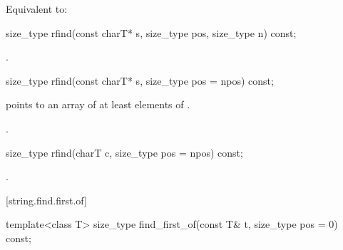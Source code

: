 \begin{itemdescr}
\pnum
\effects
Equivalent to: 
\end{itemdescr}

%
\begin{itemdecl}
size_type rfind(const charT* s, size_type pos, size_type n) const;
\end{itemdecl}

\begin{itemdescr}
\pnum
\returns
{}.
\end{itemdescr}

%
\begin{itemdecl}
size_type rfind(const charT* s, size_type pos = npos) const;
\end{itemdecl}

\begin{itemdescr}
\pnum
\requires {} points to an array of at least 
elements of .

\pnum
\returns
{}.
\end{itemdescr}

%
\begin{itemdecl}
size_type rfind(charT c, size_type pos = npos) const;
\end{itemdecl}

\begin{itemdescr}
\pnum
\returns
{}.
\end{itemdescr}

[string.find.first.of]{}

%
\begin{itemdecl}
template<class T>
  size_type find_first_of(const T& t, size_type pos = 0) const;
\end{itemdecl}

